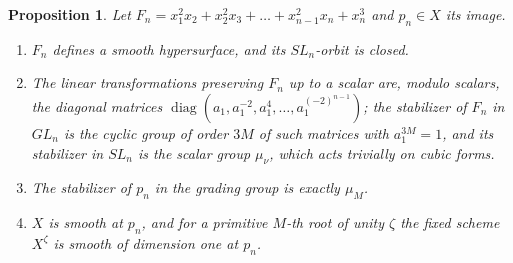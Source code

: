 \documentclass[11pt,a4paper]{article}
\newtheorem{proposition}[theorem]{Proposition}
\theoremstyle{definition}
\newcommand{\diag}{\operatorname{diag}}
\begin{document}
\begin{proposition}\label{prop:chaincubic}
Let $F_n=x_1^2x_2+x_2^2x_3+\dots+x_{n-1}^2x_n+x_n^3$ and $p_n\in X$ its image.
\begin{enumerate}
\item $F_n$ defines a smooth hypersurface, and its $SL_n$-orbit is closed.
\item The linear transformations preserving $F_n$ up to a scalar are, modulo
scalars, the diagonal matrices $\diag(a_1,a_1^{-2},a_1^4,\dots,
a_1^{(-2)^{n-1}})$; the stabilizer of $F_n$ in $GL_n$ is the cyclic group of
order $3M$ of such matrices with $a_1^{3M}=1$, and its stabilizer in $SL_n$ is
the scalar group $\mu_\nu$, which acts trivially on cubic forms.
\item The stabilizer of $p_n$ in the grading group is exactly $\mu_M$.
\item $X$ is smooth at $p_n$, and for a primitive $M$-th root of unity $\zeta$
the fixed scheme $X^\zeta$ is smooth of dimension one at $p_n$.
\end{enumerate}
\end{proposition}
\end{document}
